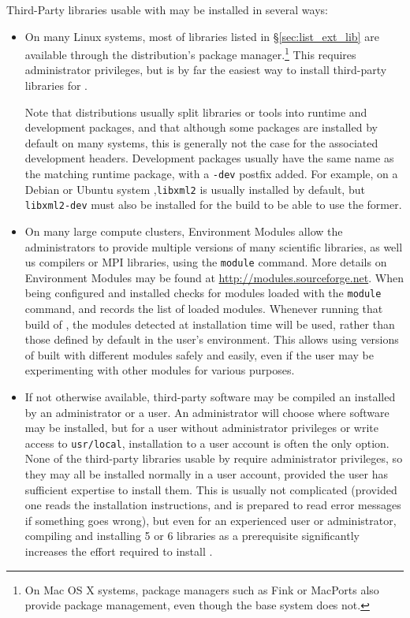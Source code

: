 \documentclass[a4paper,10pt,twoside]{csshortdoc}
\begin{document}
Third-Party libraries usable with \CS may be installed in several
ways:

\begin{itemize}
\item On many Linux systems, most of libraries listed in
      \S\ref{sec:list_ext_lib} are available through the distribution's
      package manager.\footnote{On Mac OS X systems, package managers such as
      Fink or MacPorts also provide package management, even though the
      base system does not.} This requires administrator privileges,
      but is by far the easiest way to install third-party libraries
      for \CS.

      Note that distributions usually split libraries or tools into runtime
      and development packages, and that although some packages are
      installed by default on many systems, this is generally not the
      case for the associated development headers. Development
      packages usually have the same name as the matching runtime package,
      with a \texttt{-dev} postfix added. For example, on a Debian or
      Ubuntu system ,\texttt{libxml2} is usually installed by default,
      but \texttt{libxml2-dev} must also be installed for the \CS
      build to be able to use the former.

\item On many large compute clusters, Environment Modules allow
      the administrators to provide multiple versions of many
      scientific libraries, as well us compilers or MPI libraries,
      using the \texttt{module} command. More details on
      Environment Modules may be found at \url{http://modules.sourceforge.net}.
      When being configured and installed \CS checks for modules loaded
      with the \texttt{module} command, and records the list of loaded
      modules. Whenever running that build of \CS, the modules detected
      at installation time will be used, rather than those defined by
      default in the user's environment. This allows using versions of
      \CS built with different modules safely and easily, even if the
      user may be experimenting with other modules for various purposes.

\item If not otherwise available, third-party software may be compiled
      an installed by an administrator or a user. An administrator
      will choose where software may be installed, but for a user
      without administrator privileges or write access to
      \texttt{usr/local}, installation to a user account is often
      the only option. None of the third-party libraries usable
      by \CS require administrator privileges, so they may all be
      installed normally in a user account, provided the user
      has sufficient expertise to install them. This is usually not
      complicated (provided one reads the installation instructions,
      and is prepared to read error messages if something goes wrong),
      but even for an experienced user or administrator, compiling
      and installing 5 or 6 libraries as a prerequisite significantly
      increases the effort required to install \CS.


\end{itemize}
\end{document}
